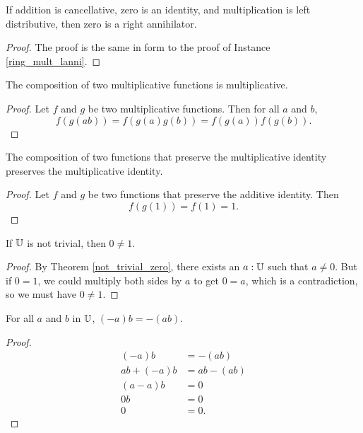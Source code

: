 \documentclass[../math.tex]{subfiles}
\begin{document}
\begin{instance} \label{ring_mult_ranni}
    If addition is cancellative, zero is an identity, and multiplication is
    left distributive, then zero is a right annihilator.
\end{instance}
\begin{proof}
    The proof is the same in form to the proof of Instance
    \ref{ring_mult_lanni}.
\end{proof}

\begin{instance}
    The composition of two multiplicative functions is multiplicative.
\end{instance}
\begin{proof}
    Let $f$ and $g$ be two multiplicative functions.  Then for all $a$ and $b$,
    \[
        f(g(ab)) = f(g(a)g(b)) = f(g(a))f(g(b)).
    \]
\end{proof}

\begin{instance}
    The composition of two functions that preserve the multiplicative identity
    preserves the multiplicative identity.
\end{instance}
\begin{proof}
    Let $f$ and $g$ be two functions that preserve the additive identity.  Then
    \[
        f(g(1)) = f(1) = 1.
    \]
\end{proof}

\begin{theorem} \label{not_trivial_one}
    If $\mathbb{U}$ is not trivial, then $0 \neq 1$.
\end{theorem}
\begin{proof}
    By Theorem \ref{not_trivial_zero}, there exists an $a : \mathbb{U}$ such that $a
    \neq 0$.  But if $0 = 1$, we could multiply both sides by $a$ to get $0 =
    a$, which is a contradiction, so we must have $0 \neq 1$.
\end{proof}

\begin{theorem}
    For all $a$ and $b$ in $\mathbb{U}$, $(-a)b = -(ab)$.
\end{theorem}
\begin{proof}
    \begin{align*}
        (-a)b &= -(ab) \\
        ab + (-a)b &= ab - (ab) \\
        (a - a)b &= 0 \\
        0b &= 0 \\
        0 &= 0.
    \end{align*}
\end{proof}
\end{document}
